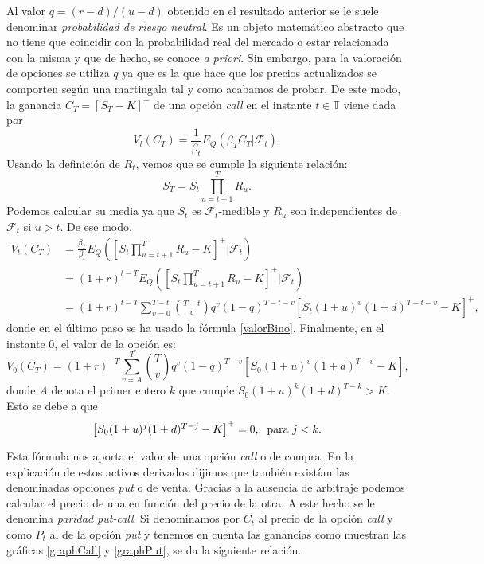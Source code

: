 Al valor $ q = (r-d)/(u-d) $ obtenido en el resultado anterior se le suele denominar \textit{probabilidad de riesgo neutral}. Es un objeto matemático abstracto que no tiene que coincidir con la probabilidad real del mercado o estar relacionada con la misma y que de hecho, se conoce \textit{a priori}. Sin embargo, para la valoración de opciones se utiliza $ q $ ya que es la que hace que los precios actualizados se comporten según una martingala tal y como acabamos de probar. De este modo, la ganancia $ C_T = \left[S_T - K\right]^+$ de una opción \textit{call} en el instante $ t \in \mathbb{T} $ viene dada por
\[
V_t(C_T) = \frac{1}{\beta_t} E_Q(\beta_T C_T | \mathcal{F}_t).
\]
Usando la definición de $ R_t $, vemos que se cumple la siguiente relación:
\[
S_T = S_t \prod_{u = t+1}^{T}R_u.
\]
Podemos calcular su media ya que $ S_t $ es $ \mathcal{F}_t $-medible y $ R_u $ son independientes de $ \mathcal{F}_t $ si $ u > t $. De ese modo,
\begin{equation*}
\begin{split}
V_t (C_T) &= \frac{\beta_T}{\beta_t}E_Q(\left[S_t\prod_{u=t+1}^{T}R_u - K\right]^+ | \mathcal{F}_t) \\
&= (1+r)^{t-T} E_Q(\left[S_t\prod_{u=t+1}^{T}R_u - K\right]^+| \mathcal{F}_t) \\
& = (1+r)^{t-T} \sum_{v=0}^{T-t}\binom{T-t}{v}q^v(1-q)^{T-t-v}\left[S_t(1+u)^v(1+d)^{T-t-v}-K\right]^+,
\end{split}
\end{equation*}
donde en el último paso se ha usado la fórmula \eqref{valorBino}. Finalmente, en el instante 0, el valor de la opción es:
\begin{equation*}
V_0(C_T) = (1+r)^{-T} \sum_{v=A}^{T}\binom{T}{v}q^v(1-q)^{T-v}\left[S_0(1+u)^v(1+d)^{T-v}-K\right],
\end{equation*}
donde $ A $ denota el primer entero $ k $ que cumple $ S_0(1+u)^k(1+d)^{T-k} > K $. Esto se debe a que \[\left[S_0(1+u)^j(1+d)^{T-j}-K\right]^+ = 0, \hspace{1mm}\text{ para } j<k.\]

Esta fórmula nos aporta el valor de una opción \textit{call} o de compra. En la explicación de estos activos derivados dijimos que también existían las denominadas opciones \textit{put} o de venta. Gracias a la ausencia de arbitraje podemos calcular el precio de una en función del precio de la otra. A este hecho se le denomina \textit{paridad put-call}. Si denominamos por $ C_t $ al precio de la opción \textit{call} y como $ P_t $ al de la opción \textit{put} y tenemos en cuenta las ganancias como muestran las gráficas \ref{graphCall} y \ref{graphPut}, se da la siguiente relación. 

